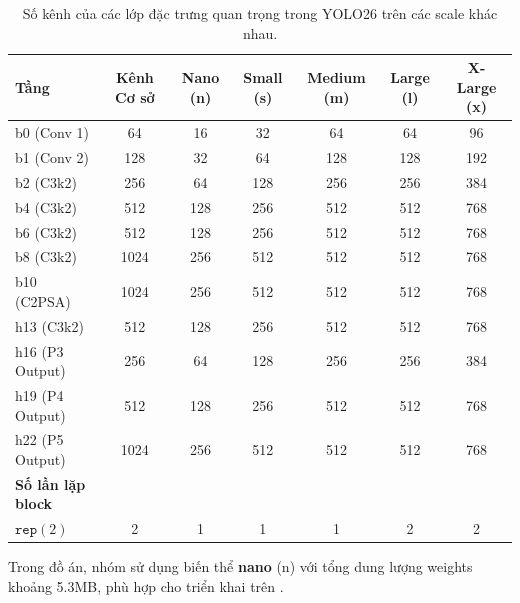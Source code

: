 \begin{table}[H]
\centering
\small
\caption{Số kênh của các lớp đặc trưng quan trọng trong YOLO26 trên các scale khác nhau.}
\label{tab:scale_channels}
\begin{tabular}{lcccccc}
\toprule
\textbf{Tầng} & \textbf{Kênh Cơ sở} & \textbf{Nano (n)} & \textbf{Small (s)} & \textbf{Medium (m)} & \textbf{Large (l)} & \textbf{X-Large (x)} \\
\midrule
b0 (Conv 1)   & 64                  & 16                & 32                 & 64                  & 64                 & 96                   \\
b1 (Conv 2)   & 128                 & 32                & 64                 & 128                 & 128                & 192                  \\
b2 (C3k2)     & 256                 & 64                & 128                & 256                 & 256                & 384                  \\
b4 (C3k2)     & 512                 & 128               & 256                & 512                 & 512                & 768                  \\
b6 (C3k2)     & 512                 & 128               & 256                & 512                 & 512                & 768                  \\
b8 (C3k2)     & 1024                & 256               & 512                & 512                 & 512                & 768                  \\
b10 (C2PSA)   & 1024                & 256               & 512                & 512                 & 512                & 768                  \\
\midrule
h13 (C3k2)    & 512                 & 128               & 256                & 512                 & 512                & 768                  \\
h16 (P3 Output)& 256                & 64                & 128                & 256                 & 256                & 384                  \\
h19 (P4 Output)& 512                & 128               & 256                & 512                 & 512                & 768                  \\
h22 (P5 Output)& 1024               & 256               & 512                & 512                 & 512                & 768                  \\
\midrule
\textbf{Số lần lặp block} & & & & & & \\
$\texttt{rep}(2)$ & 2               & 1                 & 1                  & 1                   & 2                  & 2                    \\
\bottomrule
\end{tabular}
\end{table}

Trong đồ án, nhóm sử dụng biến thể \textbf{nano} (n) với tổng dung lượng weights khoảng 5.3MB, phù hợp cho triển khai trên \rpi.
